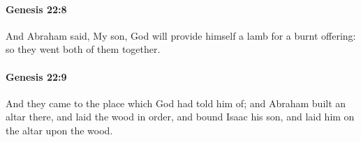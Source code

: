 		\paragraph{Genesis 22:8} %
			\label{GENESIS-22-8}

			And Abraham said, My son, God will provide himself a lamb for a burnt offering: so they went both of them together.


		\paragraph{Genesis 22:9} %
			\label{GENESIS-22-9}

			And they came to the place which God had told him of; and Abraham built an altar there, and laid the wood in order, and bound Isaac his son, and laid him on the altar upon the wood.


